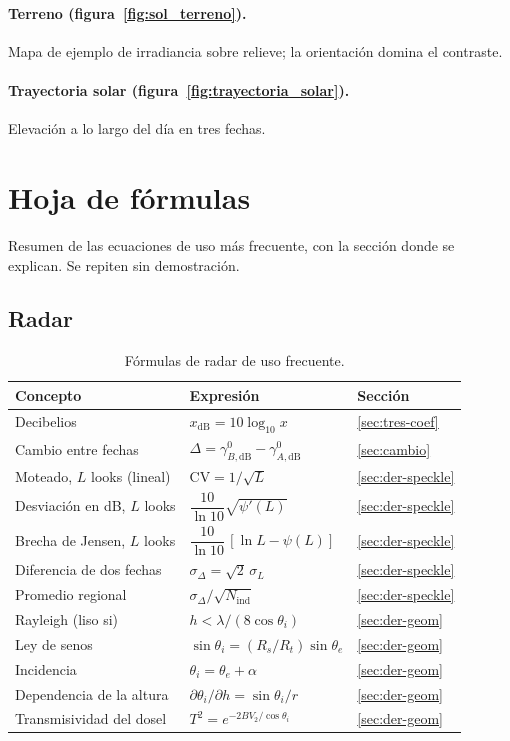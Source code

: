 \documentclass[11pt,a4paper]{article}
\begin{document}
\paragraph{Terreno (figura~\ref{fig:sol_terreno}).} Mapa de ejemplo de irradiancia sobre relieve; la
orientación domina el contraste.

\paragraph{Trayectoria solar (figura~\ref{fig:trayectoria_solar}).} Elevación a lo largo del día en tres
fechas.


\section{Hoja de fórmulas}
\label{sec:formulas}

Resumen de las ecuaciones de uso más frecuente, con la sección donde se explican. Se repiten sin demostración.

\subsection*{Radar}
\begin{table}[htbp]
\centering
\caption{Fórmulas de radar de uso frecuente.}
\label{tab:formulas-radar}
\small
\begin{tabularx}{\linewidth}{@{}lXl@{}}
\toprule
Concepto & Expresión & Sección \\
\midrule
Decibelios & $x_{\mathrm{dB}}=10\log_{10}x$ & \ref{sec:tres-coef} \\
Cambio entre fechas & $\Delta=\gamma^0_{B,\mathrm{dB}}-\gamma^0_{A,\mathrm{dB}}$ & \ref{sec:cambio} \\
Moteado, $L$ looks (lineal) & $\mathrm{CV}=1/\sqrt L$ & \ref{sec:der-speckle} \\
Desviación en dB, $L$ looks & $\dfrac{10}{\ln10}\sqrt{\psi'(L)}$ & \ref{sec:der-speckle} \\
Brecha de Jensen, $L$ looks & $\dfrac{10}{\ln10}\,[\ln L-\psi(L)]$ & \ref{sec:der-speckle} \\
Diferencia de dos fechas & $\sigma_\Delta=\sqrt2\,\sigma_L$ & \ref{sec:der-speckle} \\
Promedio regional & $\sigma_\Delta/\sqrt{N_{\mathrm{ind}}}$ & \ref{sec:der-speckle} \\
Rayleigh (liso si) & $h<\lambda/(8\cos\theta_i)$ & \ref{sec:der-geom} \\
Ley de senos & $\sin\theta_i=(R_s/R_t)\sin\theta_e$ & \ref{sec:der-geom} \\
Incidencia & $\theta_i=\theta_e+\alpha$ & \ref{sec:der-geom} \\
Dependencia de la altura & $\partial\theta_i/\partial h=\sin\theta_i/r$ & \ref{sec:der-geom} \\
Transmisividad del dosel & $T^2=e^{-2BV_2/\cos\theta_i}$ & \ref{sec:der-geom} \\
\bottomrule
\end{tabularx}
\end{table}
\end{document}

